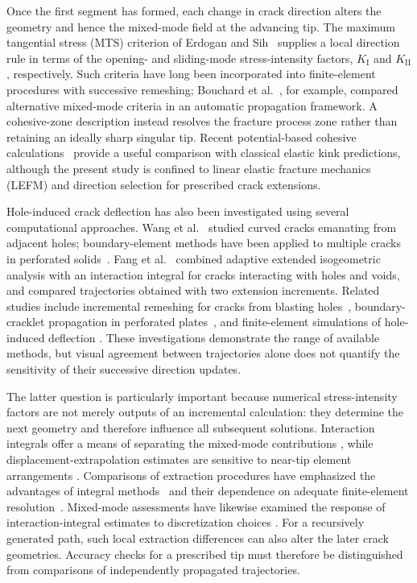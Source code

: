 \documentclass[11pt]{article}
\begin{document}
Once the first segment has formed, each change in crack direction
alters the geometry and hence the mixed-mode field at the advancing
tip. The maximum tangential stress (MTS) criterion of Erdogan and
Sih~\cite{ErdoganSih1963} supplies a local direction rule in terms of
the opening- and sliding-mode stress-intensity factors,
$K_{\mathrm{I}}$ and $K_{\mathrm{II}}$, respectively. Such criteria
have long been incorporated into finite-element procedures with
successive remeshing; Bouchard et al.~\cite{BouchardEtAl2003},
for example, compared alternative mixed-mode criteria in an
automatic propagation framework. A cohesive-zone description
instead resolves the fracture process zone rather than retaining
an ideally sharp singular tip. Recent potential-based cohesive
calculations~\cite{BogdanovSelivanov2026} provide a useful
comparison with classical elastic kink predictions, although the
present study is confined to linear elastic fracture mechanics
(LEFM) and direction selection for prescribed crack extensions.

Hole-induced crack deflection has also been investigated using
several computational approaches. Wang et al.~\cite{WangMeguidPapanikos1999}
studied curved cracks emanating from adjacent holes; boundary-element
methods have been applied to multiple cracks in perforated
solids~\cite{LiuLiXie2017}. Fang et al.~\cite{FangEtAl2020}
combined adaptive extended isogeometric analysis with an
interaction integral for cracks interacting with holes and voids,
and compared trajectories obtained with two extension increments.
Related studies include incremental remeshing for cracks from
blasting holes~\cite{YangEtAl2020}, boundary-cracklet
propagation in perforated plates~\cite{AhmedEtAl2021}, and
finite-element simulations of hole-induced deflection
\cite{AlshoaibiFageehi2022}. These investigations demonstrate
the range of available methods, but visual agreement between
trajectories alone does not quantify the sensitivity of their
successive direction updates.

The latter question is particularly important because numerical
stress-intensity factors are not merely outputs of an incremental
calculation: they determine the next geometry and therefore
influence all subsequent solutions. Interaction integrals offer
a means of separating the mixed-mode contributions
\cite{YauWangCorten1980}, while displacement-extrapolation
estimates are sensitive to near-tip element arrangements
\cite{GuineaPlanasElices2000}. Comparisons of extraction
procedures have emphasized the advantages of integral
methods~\cite{CourtinEtAl2005} and their dependence on
adequate finite-element resolution~\cite{QianEtAl2016}.
Mixed-mode assessments have likewise examined the response
of interaction-integral estimates to discretization choices
\cite{GhafooriAhangarVerreman2019}. For a recursively generated
path, such local extraction differences can also alter the
later crack geometries. Accuracy checks for a prescribed tip
must therefore be distinguished from comparisons of
independently propagated trajectories.
\end{document}
